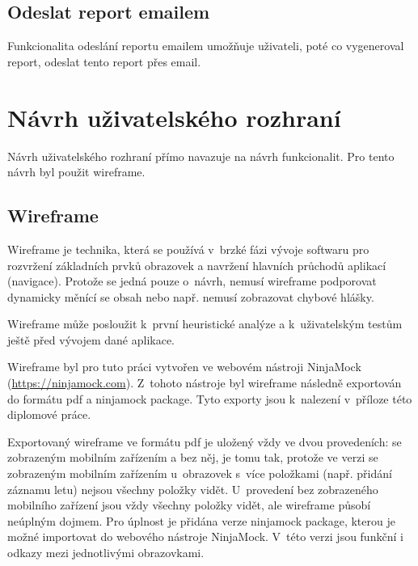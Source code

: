 \documentclass[thesis=M,czech]{FITthesis}[2012/06/26]
\begin{document}
\subsection{Odeslat report emailem}
Funkcionalita odeslání reportu emailem umožňuje uživateli, poté co vygeneroval report, odeslat tento report přes email.

\section{Návrh uživatelského rozhraní}
Návrh uživatelského rozhraní přímo navazuje na návrh funkcionalit. Pro tento návrh byl použit wireframe.

\subsection{Wireframe}
Wireframe je technika, která se používá v~brzké fázi vývoje softwaru \cite{nngWireframe} pro rozvržení základních prvků obrazovek a navržení hlavních průchodů aplikací (navigace). Protože se jedná pouze o~návrh, nemusí wireframe podporovat dynamicky měnící se obsah nebo např. nemusí zobrazovat chybové hlášky.

Wireframe může posloužit k~první heuristické analýze a k~uživatelským testům ještě před vývojem dané aplikace. \cite{exux}

Wireframe byl pro tuto práci vytvořen ve webovém nástroji NinjaMock (\url{https://ninjamock.com}). Z~tohoto nástroje byl wireframe následně exportován do formátu pdf a ninjamock package. Tyto exporty jsou k~nalezení v~příloze této diplomové práce. 

Exportovaný wireframe ve formátu pdf je uložený vždy ve dvou provedeních: se zobrazeným mobilním zařízením a bez něj, je tomu tak, protože ve verzi se zobrazeným mobilním zařízením u~obrazovek s~více položkami (např. přidání záznamu letu) nejsou všechny položky vidět. U~provedení bez zobrazeného mobilního zařízení jsou vždy všechny položky vidět, ale wireframe působí neúplným dojmem. Pro úplnost je přidána verze ninjamock package, kterou je možné importovat do webového nástroje NinjaMock. V~této verzi jsou funkční i odkazy mezi jednotlivými obrazovkami. 
\end{document}
